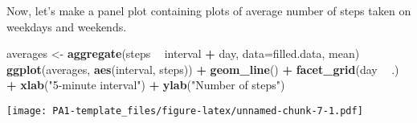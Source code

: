 \documentclass[
]{article}
\newenvironment{Shaded}{\begin{snugshade}}{\end{snugshade}}
\newcommand{\DataTypeTok}[1]{\textcolor[rgb]{0.13,0.29,0.53}{#1}}
\newcommand{\KeywordTok}[1]{\textcolor[rgb]{0.13,0.29,0.53}{\textbf{#1}}}
\newcommand{\NormalTok}[1]{#1}
\newcommand{\OperatorTok}[1]{\textcolor[rgb]{0.81,0.36,0.00}{\textbf{#1}}}
\newcommand{\StringTok}[1]{\textcolor[rgb]{0.31,0.60,0.02}{#1}}
\begin{document}
Now, let's make a panel plot containing plots of average number of steps
taken on weekdays and weekends.

\begin{Shaded}
\begin{Highlighting}[]
\NormalTok{averages <-}\StringTok{ }\KeywordTok{aggregate}\NormalTok{(steps }\OperatorTok{~}\StringTok{ }\NormalTok{interval }\OperatorTok{+}\StringTok{ }\NormalTok{day, }\DataTypeTok{data=}\NormalTok{filled.data, mean)}
\KeywordTok{ggplot}\NormalTok{(averages, }\KeywordTok{aes}\NormalTok{(interval, steps)) }\OperatorTok{+}\StringTok{ }\KeywordTok{geom_line}\NormalTok{() }\OperatorTok{+}\StringTok{ }\KeywordTok{facet_grid}\NormalTok{(day }\OperatorTok{~}\StringTok{ }\NormalTok{.) }\OperatorTok{+}
\StringTok{    }\KeywordTok{xlab}\NormalTok{(}\StringTok{"5-minute interval"}\NormalTok{) }\OperatorTok{+}\StringTok{ }\KeywordTok{ylab}\NormalTok{(}\StringTok{"Number of steps"}\NormalTok{)}
\end{Highlighting}
\end{Shaded}

\texttt{[image: PA1-template\_files/figure-latex/unnamed-chunk-7-1.pdf]}
\end{document}
